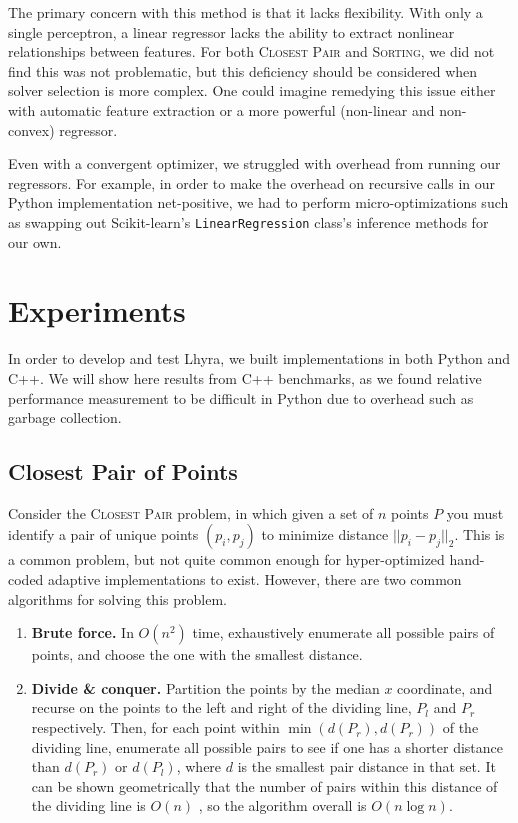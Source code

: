 \documentclass{article}
\begin{document}
The primary concern with this method is that it lacks flexibility. With only a single perceptron, a linear regressor lacks the ability to extract nonlinear relationships between features. For both \textsc{Closest Pair} and \textsc{Sorting}, we did not find this was not problematic, but this deficiency should be considered when solver selection is more complex. One could imagine remedying this issue either with automatic feature extraction or a more powerful (non-linear and non-convex) regressor.

Even with a convergent optimizer, we struggled with overhead from running our regressors.  For example, in order to make the overhead on recursive calls in our Python implementation net-positive, we had to perform micro-optimizations such as swapping out Scikit-learn's \texttt{LinearRegression} \cite{sklearn} class's inference methods for our own. 

\section{Experiments}

In order to develop and test Lhyra, we built implementations in both Python and C++.  We will  show here results from C++ benchmarks, as we found relative performance measurement to be difficult in Python due to overhead such as garbage collection.

\subsection{Closest Pair of Points}

Consider the \textsc{Closest Pair} problem, in which given a set of $n$ points $P$ you must identify a pair of unique points $(p_i,p_j)$ to minimize distance $||p_i - p_j||_2$.  This is a common problem, but not quite common enough for hyper-optimized hand-coded adaptive implementations to exist.  However, there are two common algorithms for solving this problem.

\begin{enumerate}
    \item \textbf{Brute force.}  In $O(n^2)$ time, exhaustively enumerate all possible pairs of points, and choose the one with the smallest distance.
    \item \textbf{Divide \& conquer.}  Partition the points by the median $x$ coordinate, and recurse on the points to the left and right of the dividing line, $P_l$ and $P_r$ respectively.  Then, for each point within $\min(d(P_r),d(P_r))$ of the dividing line, enumerate all possible pairs to see if one has a shorter distance than $d(P_r)$ or $d(P_l)$, where $d$ is the smallest pair distance in that set.  It can be shown geometrically that the number of pairs within this distance of the dividing line is $O(n)$ \cite{clrs}, so the algorithm overall is $O(n\log n)$.
\end{enumerate}
\end{document}
